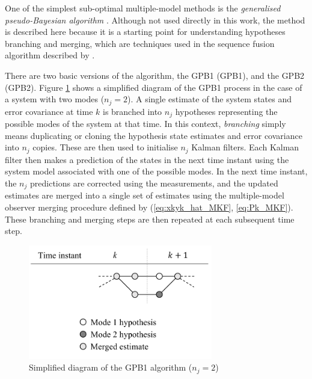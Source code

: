 {{One of the simplest sub-optimal multiple-model methods is the \textit{generalised pseudo-Bayesian algorithm} \citep{buxbaum_recursive_1969, jaffer_estimation_1971, tugnait_detection_1982}. Although not used directly in this work, the method is described here because it is a starting point for understanding hypotheses branching and merging, which are techniques used in the sequence fusion algorithm described by \cite{robertson_detection_1995}.

There are two basic versions of the algorithm, the \acrlong{GPB1} (\acrshort{GPB1}), and the \acrlong{GPB2} (\acrshort{GPB2}). Figure \ref{fig:mm-obs-gpb1} shows a simplified diagram of the \gls{GPB1} process in the case of a system with two modes ($n_j=2$). A single estimate of the system states and error covariance at time $k$ is branched into $n_j$ hypotheses representing the possible modes of the system at that time. In this context, \textit{branching} simply means duplicating or cloning the hypothesis state estimates and error covariance into $n_j$ copies. These are then used to initialise $n_j$ Kalman filters. Each Kalman filter then makes a prediction of the states in the next time instant using the system model associated with one of the possible modes. In the next time instant, the $n_j$ predictions are corrected using the measurements, and the updated estimates are merged into a single set of estimates using the multiple-model observer merging procedure defined by (\ref{eq:xkyk_hat_MKF}, \ref{eq:Pk_MKF}). These branching and merging steps are then repeated at each subsequent time step.
\begin{figure}[ht]
	\centering
	\includegraphics[height=5cm]{images/mm_obs_seq_gpb1.pdf}
	\caption{Simplified diagram of the \gls{GPB1} algorithm ($n_j=2$)}
	\label{fig:mm-obs-gpb1}
\end{figure}

}}
